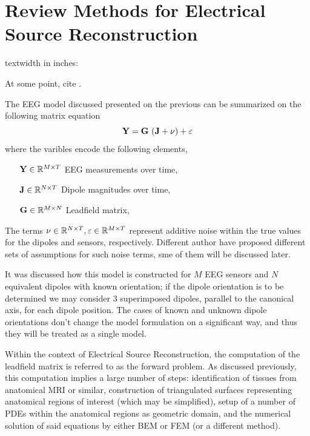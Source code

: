 \chapter{Review Methods for Electrical Source Reconstruction}


textwidth in inches: \prntlen{\textwidth}

\label{ch:review}

At some point, cite \cite{grech2008review}.

The EEG model discussed presented on the previous can be summarized on the following matrix equation
\begin{equation}
\mathbf{Y} = \mathbf{G}\, \left(  \mathbf{J} + \nu  \right) + \varepsilon
\label{eq:general}
\end{equation}
where the varibles encode the following elements,
\begin{itemize}
\item[$\mathbf{Y} \in \mathbb{R}^{M\times T}$] EEG measurements over time,
\item[$\mathbf{J} \in \mathbb{R}^{N\times T}$] Dipole magnitudes over time,
\item[$\mathbf{G} \in \mathbb{R}^{M\times N}$] Leadfield matrix,
\end{itemize}
%
The terms $\nu \in \mathbb{R}^{N\times T}, \varepsilon\in\mathbb{R}^{M\times T}$ represent additive noise within the true values for the dipoles and sensors, respectively. 
%
Different author have proposed different sets of assumptions for such noise terms, sme of them will be discussed later.

It was discussed how this model is constructed for $M$ EEG sensors and $N$ equivalent dipoles with known orientation; if the dipole orientation is to be determined we may consider 3 superimposed dipoles, parallel to the canonical axis, for each dipole position.
%
The cases of known and unknown dipole orientations don't change the model formulation on a significant way, and thus they will be treated as a single model.

Within the context of Electrical Source Reconstruction, the computation of the leadfield matrix is referred to as the forward problem.
%
As discussed previously, this computation implies a large number of steps: identification of tissues from anatomical MRI or similar, construction of triangulated surfaces representing anatomical regions of interest (which may be simplified), setup of a number of PDEs within the anatomical regions as geometric domain, and the numerical solution of said equations by either BEM or FEM (or a different method).


